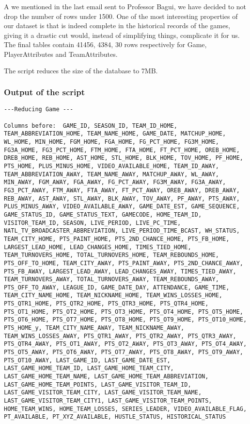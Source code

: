 \documentclass{article}
\begin{document}
A we mentioned in the last email sent to Professor Bagui, we have decided to not drop the number of rows under 1500. One of the most interesting properties of our dataset is that is indeed complete in the historical records of the games, giving it a drastic cut would, instead of simplifying things, complicate it for us. The final tables contain 41456, 4384, 30 rows respectively for Game, PlayerAttributes and TeamAttributes.

The script reduces the size of the database to 7MB.

\subsubsection*{Output of the script}

\begin{lstlisting}
---Reducing Game ---

Columns before:  GAME_ID, SEASON_ID, TEAM_ID_HOME, TEAM_ABBREVIATION_HOME, TEAM_NAME_HOME, GAME_DATE, MATCHUP_HOME, WL_HOME, MIN_HOME, FGM_HOME, FGA_HOME, FG_PCT_HOME, FG3M_HOME, FG3A_HOME, FG3_PCT_HOME, FTM_HOME, FTA_HOME, FT_PCT_HOME, OREB_HOME, DREB_HOME, REB_HOME, AST_HOME, STL_HOME, BLK_HOME, TOV_HOME, PF_HOME, PTS_HOME, PLUS_MINUS_HOME, VIDEO_AVAILABLE_HOME, TEAM_ID_AWAY, TEAM_ABBREVIATION_AWAY, TEAM_NAME_AWAY, MATCHUP_AWAY, WL_AWAY, MIN_AWAY, FGM_AWAY, FGA_AWAY, FG_PCT_AWAY, FG3M_AWAY, FG3A_AWAY, FG3_PCT_AWAY, FTM_AWAY, FTA_AWAY, FT_PCT_AWAY, OREB_AWAY, DREB_AWAY, REB_AWAY, AST_AWAY, STL_AWAY, BLK_AWAY, TOV_AWAY, PF_AWAY, PTS_AWAY, PLUS_MINUS_AWAY, VIDEO_AVAILABLE_AWAY, GAME_DATE_EST, GAME_SEQUENCE, GAME_STATUS_ID, GAME_STATUS_TEXT, GAMECODE, HOME_TEAM_ID, VISITOR_TEAM_ID, SEASON, LIVE_PERIOD, LIVE_PC_TIME, NATL_TV_BROADCASTER_ABBREVIATION, LIVE_PERIOD_TIME_BCAST, WH_STATUS, TEAM_CITY_HOME, PTS_PAINT_HOME, PTS_2ND_CHANCE_HOME, PTS_FB_HOME, LARGEST_LEAD_HOME, LEAD_CHANGES_HOME, TIMES_TIED_HOME, TEAM_TURNOVERS_HOME, TOTAL_TURNOVERS_HOME, TEAM_REBOUNDS_HOME, PTS_OFF_TO_HOME, TEAM_CITY_AWAY, PTS_PAINT_AWAY, PTS_2ND_CHANCE_AWAY, PTS_FB_AWAY, LARGEST_LEAD_AWAY, LEAD_CHANGES_AWAY, TIMES_TIED_AWAY, TEAM_TURNOVERS_AWAY, TOTAL_TURNOVERS_AWAY, TEAM_REBOUNDS_AWAY, PTS_OFF_TO_AWAY, LEAGUE_ID, GAME_DATE_DAY, ATTENDANCE, GAME_TIME, TEAM_CITY_NAME_HOME, TEAM_NICKNAME_HOME, TEAM_WINS_LOSSES_HOME, PTS_QTR1_HOME, PTS_QTR2_HOME, PTS_QTR3_HOME, PTS_QTR4_HOME, PTS_OT1_HOME, PTS_OT2_HOME, PTS_OT3_HOME, PTS_OT4_HOME, PTS_OT5_HOME, PTS_OT6_HOME, PTS_OT7_HOME, PTS_OT8_HOME, PTS_OT9_HOME, PTS_OT10_HOME, PTS_HOME_y, TEAM_CITY_NAME_AWAY, TEAM_NICKNAME_AWAY, TEAM_WINS_LOSSES_AWAY, PTS_QTR1_AWAY, PTS_QTR2_AWAY, PTS_QTR3_AWAY, PTS_QTR4_AWAY, PTS_OT1_AWAY, PTS_OT2_AWAY, PTS_OT3_AWAY, PTS_OT4_AWAY, PTS_OT5_AWAY, PTS_OT6_AWAY, PTS_OT7_AWAY, PTS_OT8_AWAY, PTS_OT9_AWAY, PTS_OT10_AWAY, LAST_GAME_ID, LAST_GAME_DATE_EST, LAST_GAME_HOME_TEAM_ID, LAST_GAME_HOME_TEAM_CITY, LAST_GAME_HOME_TEAM_NAME, LAST_GAME_HOME_TEAM_ABBREVIATION, LAST_GAME_HOME_TEAM_POINTS, LAST_GAME_VISITOR_TEAM_ID, LAST_GAME_VISITOR_TEAM_CITY, LAST_GAME_VISITOR_TEAM_NAME, LAST_GAME_VISITOR_TEAM_CITY1, LAST_GAME_VISITOR_TEAM_POINTS, HOME_TEAM_WINS, HOME_TEAM_LOSSES, SERIES_LEADER, VIDEO_AVAILABLE_FLAG, PT_AVAILABLE, PT_XYZ_AVAILABLE, HUSTLE_STATUS, HISTORICAL_STATUS 


\end{lstlisting}
\end{document}
